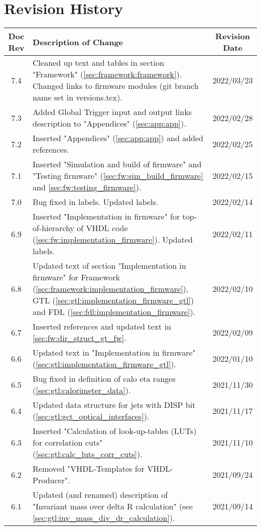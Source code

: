 \section*{Revision History}
\label{sec:revision_history}

\begin{longtable}{|c|p{}|c|}
\hline
Doc Rev & Description of Change & Revision Date\\
\hline
\hline
\endhead
7.4 & Cleaned up text and tables in section "Framework" (\ref{sec:framework:framework}). Changed links to firmware modules (git branch name set in versions.tex). & 2022/03/23\\
7.3 & Added Global Trigger input and output links description to "Appendices" (\ref{sec:app:app}). & 2022/02/28\\
7.2 & Inserted "Appendices" (\ref{sec:app:app}) and added references. & 2022/02/25\\
7.1 & Inserted "Simulation and build of firmware" and "Testing firmware" (\ref{sec:fw:sim_build_firmware} and \ref{sec:fw:testing_firmware}). & 2022/02/15\\
7.0 & Bug fixed in labels. Updated labels. & 2022/02/14\\
6.9 & Inserted "Implementation in firmware" for top-of-hierarchy of VHDL code (\ref{sec:fw:implementation_firmware}). Updated labels. & 2022/02/11\\
6.8 & Updated text of section "Implementation in firmware" for Framework (\ref{sec:framework:implementation_firmware}), GTL (\ref{sec:gtl:implementation_firmware_gtl}) and FDL (\ref{sec:fdl:implementation_firmware}). & 2022/02/10\\
6.7 & Inserted references and updated text in \ref{sec:fw:dir_struct_gt_fw}. & 2022/02/09\\
6.6 & Updated text in "Implementation in firmware" (\ref{sec:gtl:implementation_firmware_gtl}). & 2022/01/10\\
6.5 & Bug fixed in definition of calo eta ranges (\ref{sec:gtl:calorimeter_data}). & 2021/11/30\\
6.4 & Updated data structure for jets with DISP bit (\ref{sec:gtl:gct_optical_interfaces}). & 2021/11/17\\
6.3 & Inserted "Calculation of look-up-tables (LUTs) for correlation cuts" (\ref{sec:gtl:calc_luts_corr_cuts}). & 2021/11/10\\
6.2 & Removed "VHDL-Templates for VHDL-Producer". & 2021/09/24\\
6.1 & Updated (and renamed) description of "Invariant mass over delta R calculation" (see \ref{sec:gtl:inv_mass_div_dr_calculation}). & 2021/09/14\\

\end{longtable}
